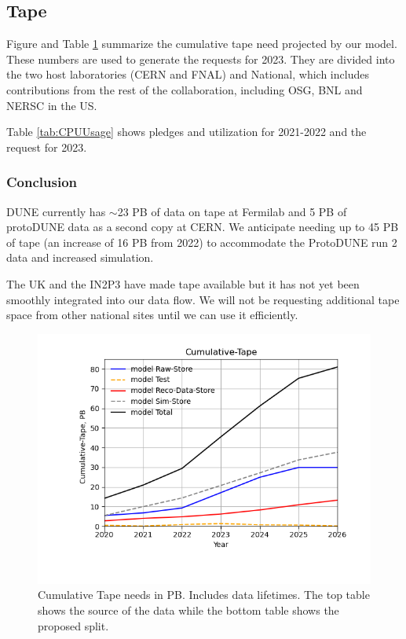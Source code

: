\documentclass[12pt]{article}
\begin{document}
\clearpage
\subsection{Tape}



Figure and Table  \ref{fig:Cumulative-Tape}  summarize the cumulative  tape need projected by our model. These numbers are used to generate the requests for 2023.  They are divided into the two host laboratories (CERN and FNAL) and National, which includes contributions from the rest of the collaboration, including OSG, BNL and NERSC in the US. 


Table \ref{tab:CPUUsage} shows pledges and utilization for 2021-2022 and the request for 2023.  \subsubsection{Conclusion}\label{sec:taperesult}
DUNE currently has $\sim$23 PB of data on tape at Fermilab and 5 PB of protoDUNE data as a second copy at CERN.  We anticipate needing up to 45 PB of tape (an increase of 16 PB from 2022) to accommodate the ProtoDUNE run 2 data and increased simulation. 

The UK and the IN2P3 have made tape available but it has not yet been smoothly integrated into our data flow.  We will not be requesting additional tape space from other national sites until we can use it efficiently. 

\begin{figure}[h]
\centering\includegraphics[height=0.4\textwidth]{MoreSim_2022-11-21-2026/MoreSim_2022-11-21-2026-Cumulative-Tape.png}

\caption{Cumulative Tape needs in PB. Includes data lifetimes.  The top table shows the source of the data while the bottom table  shows the proposed split.}\label{fig:Cumulative-Tape}
\end{figure}
\end{document}
